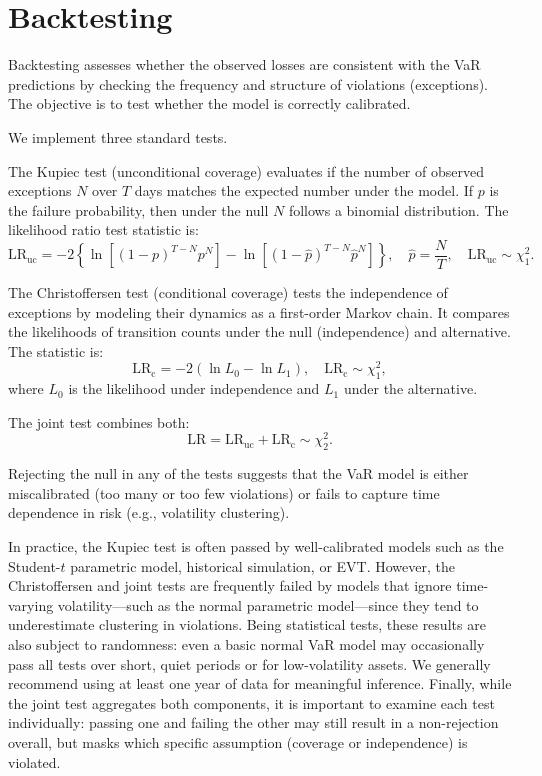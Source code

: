 \documentclass[12pt]{article}
\begin{document}
\section{Backtesting}


Backtesting assesses whether the observed losses are consistent with the VaR predictions by checking the frequency and structure of violations (exceptions). The objective is to test whether the model is correctly calibrated.

We implement three standard tests.

The Kupiec test (unconditional coverage) evaluates if the number of observed exceptions $N$ over $T$ days matches the expected number under the model. If $p$ is the failure probability, then under the null $N$ follows a binomial distribution. The likelihood ratio test statistic is:
\[
\text{LR}_{\text{uc}} = -2 \left\{ \ln\left[(1 - p)^{T - N} p^N \right] - \ln\left[(1 - \hat{p})^{T - N} \hat{p}^N \right] \right\}, \quad \hat{p} = \frac{N}{T}, \quad \text{LR}_{\text{uc}} \sim \chi^2_1.
\]

The Christoffersen test (conditional coverage) tests the independence of exceptions by modeling their dynamics as a first-order Markov chain. It compares the likelihoods of transition counts under the null (independence) and alternative. The statistic is:
\[
\text{LR}_{\text{c}} = -2 (\ln L_0 - \ln L_1), \quad \text{LR}_{\text{c}} \sim \chi^2_1,
\]
where $L_0$ is the likelihood under independence and $L_1$ under the alternative.

The joint test combines both:
\[
\text{LR} = \text{LR}_{\text{uc}} + \text{LR}_{\text{c}} \sim \chi^2_2.
\]

Rejecting the null in any of the tests suggests that the VaR model is either miscalibrated (too many or too few violations) or fails to capture time dependence in risk (e.g., volatility clustering).

In practice, the Kupiec test is often passed by well-calibrated models such as the Student-$t$ parametric model, historical simulation, or EVT. However, the Christoffersen and joint tests are frequently failed by models that ignore time-varying volatility—such as the normal parametric model—since they tend to underestimate clustering in violations. Being statistical tests, these results are also subject to randomness: even a basic normal VaR model may occasionally pass all tests over short, quiet periods or for low-volatility assets. We generally recommend using at least one year of data for meaningful inference. Finally, while the joint test aggregates both components, it is important to examine each test individually: passing one and failing the other may still result in a non-rejection overall, but masks which specific assumption (coverage or independence) is violated.
\end{document}
